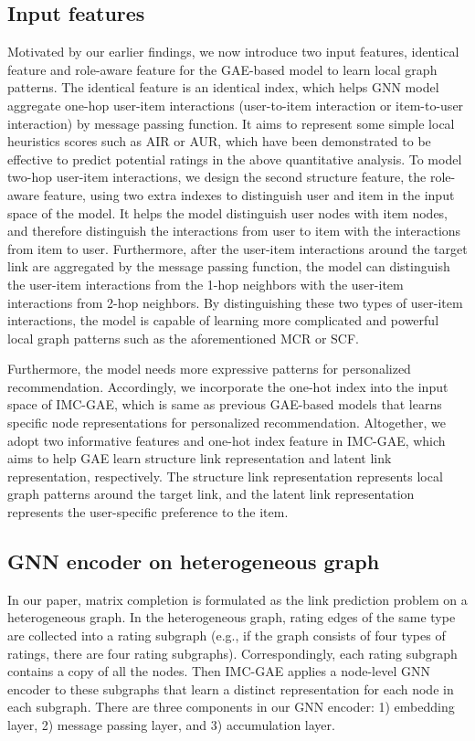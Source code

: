 \documentclass[sigconf]{acmart}
\begin{document}
\subsection{Input features}
\label{sub_sec_2}
Motivated by our earlier findings, we now introduce two input features, identical feature and role-aware feature for the GAE-based model to learn local graph patterns. The identical feature is an identical index, which helps GNN model aggregate one-hop user-item interactions (user-to-item interaction or item-to-user interaction) by message passing function. It aims to represent some simple local heuristics scores such as AIR or AUR, which have been demonstrated to be effective to predict potential ratings in the above quantitative analysis. 
To model two-hop user-item interactions, we design the second structure feature, the role-aware feature, using two extra indexes to distinguish user and item in the input space of the model. It helps the model distinguish user nodes with item nodes, and therefore distinguish the interactions from user to item with the interactions from item to user. Furthermore, after the user-item interactions around the target link are aggregated by the message passing function, the model can distinguish the user-item interactions from the 1-hop neighbors with the user-item interactions from 2-hop neighbors. By distinguishing these two types of user-item interactions, the model is capable of learning more complicated and powerful local graph patterns such as the aforementioned MCR or SCF. 

Furthermore, the model needs more expressive patterns for personalized recommendation. Accordingly, we incorporate the one-hot index into the input space of IMC-GAE, which is same as previous GAE-based models that learns specific node representations for personalized recommendation. Altogether, we adopt two informative features and one-hot index feature in IMC-GAE, which aims to help GAE learn structure link representation and latent link representation, respectively. The structure link representation represents local graph patterns around the target link, and the latent link representation represents the user-specific preference to the item.

\subsection{GNN encoder on heterogeneous graph}
In our paper, matrix completion is formulated as the link prediction problem on a heterogeneous graph. In the heterogeneous graph, rating edges of the same type are collected into a rating subgraph (e.g., if the graph consists of four types of ratings, there are four rating subgraphs). Correspondingly, each rating subgraph contains a copy of all the nodes. Then IMC-GAE applies a node-level GNN encoder to these subgraphs that learn a distinct representation for each node in each subgraph. There are three components in our GNN encoder: 1) embedding layer, 2) message passing layer, and 3) accumulation layer. 
\end{document}
